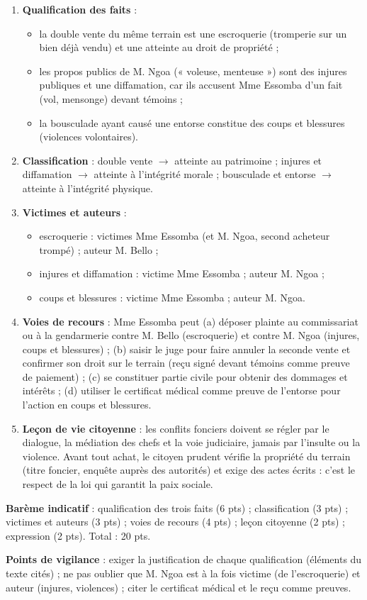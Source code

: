 \documentclass[11pt]{article}
\newcommand{\cle}[1]{{\popxbold\color{popdark}#1}}
\begin{document}
\begin{corrige}
\begin{enumerate}
\item \textbf{Qualification des faits} :
\begin{itemize}
\item la double vente du même terrain est une \cle{escroquerie} (tromperie sur un bien déjà vendu) et une atteinte au droit de propriété ;
\item les propos publics de M. Ngoa (« voleuse, menteuse ») sont des \cle{injures publiques} et une \cle{diffamation}, car ils accusent Mme Essomba d'un fait (vol, mensonge) devant témoins ;
\item la bousculade ayant causé une entorse constitue des \cle{coups et blessures} (violences volontaires).
\end{itemize}
\item \textbf{Classification} : double vente $\rightarrow$ atteinte au \cle{patrimoine} ; injures et diffamation $\rightarrow$ atteinte à l'intégrité \cle{morale} ; bousculade et entorse $\rightarrow$ atteinte à l'intégrité \cle{physique}.
\item \textbf{Victimes et auteurs} :
\begin{itemize}
\item escroquerie : victimes Mme Essomba (et M. Ngoa, second acheteur trompé) ; auteur M. Bello ;
\item injures et diffamation : victime Mme Essomba ; auteur M. Ngoa ;
\item coups et blessures : victime Mme Essomba ; auteur M. Ngoa.
\end{itemize}
\item \textbf{Voies de recours} : Mme Essomba peut (a) déposer plainte au commissariat ou à la gendarmerie contre M. Bello (escroquerie) et contre M. Ngoa (injures, coups et blessures) ; (b) saisir le juge pour faire annuler la seconde vente et confirmer son droit sur le terrain (reçu signé devant témoins comme preuve de paiement) ; (c) se constituer partie civile pour obtenir des dommages et intérêts ; (d) utiliser le \cle{certificat médical} comme preuve de l'entorse pour l'action en coups et blessures.
\item \textbf{Leçon de vie citoyenne} : les conflits fonciers doivent se régler par le dialogue, la médiation des chefs et la voie judiciaire, jamais par l'insulte ou la violence. Avant tout achat, le citoyen prudent vérifie la propriété du terrain (titre foncier, enquête auprès des autorités) et exige des actes écrits : c'est le respect de la loi qui garantit la paix sociale.
\end{enumerate}
\textbf{Barème indicatif} : qualification des trois faits (6 pts) ; classification (3 pts) ; victimes et auteurs (3 pts) ; voies de recours (4 pts) ; leçon citoyenne (2 pts) ; expression (2 pts). Total : 20 pts.

\textbf{Points de vigilance} : exiger la justification de chaque qualification (éléments du texte cités) ; ne pas oublier que M. Ngoa est à la fois victime (de l'escroquerie) et auteur (injures, violences) ; citer le certificat médical et le reçu comme preuves.
\end{corrige}
\end{document}
